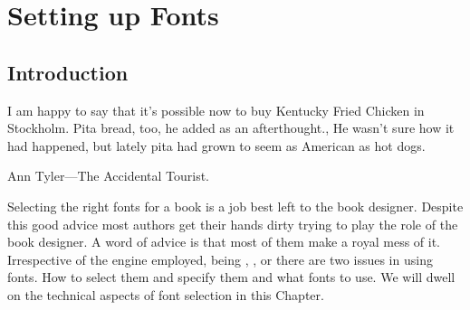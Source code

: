\newfontfamily{}
\let\codetwothousandone\pan
\let\codetwothousand\pan
\newcommand{\mf}{{\fontencoding{U}\fontfamily{zmf}\selectfont METAFONT}}

\newcommand{\pcstrut}{\vrule height11pt width0pt}

\newcommand{\sample}{Typographia Ars Artium Omnium}%

\newcommand{\thefont}[4][OT1]{%
	\textcolor{thefontname}{#2}&%
	\pcstrut\fontencoding{#1}\fontfamily{#3}\selectfont#4\\}

\newcommand{\fonttitle}[1]{%
	\multicolumn2{p{\columnwidth}}{\vrule height1.5pc width0pt
	\fontseries{b}\selectfont\textcolor{black}{#1}}\\[3pt]}


\newfontfamily{}

\newfontfamily{}

\newfontfamily{}

\def\marlborologo{%
{\fboxsep=2pt\marlboro \colorbox{red800}{\textcolor{white}{MARLBORO}}}
}



\chapter{Setting up Fonts}
\label{ch:fonts}
\section{Introduction}

\epigraph{I am happy to say that it's
possible now to buy Kentucky Fried Chicken in Stockholm. Pita bread, too, he added as an
afterthought., He wasn't sure how it had happened, but lately pita had grown to seem as American
as hot dogs.}{Ann Tyler---The Accidental Tourist.}

\pagestyle{headings}
Selecting the right fonts for a book is a job best left to the book designer. Despite this good advice most \latex authors get their hands dirty trying to play the role of the book designer. A word of advice is that most of them make a royal mess of it. Irrespective of the \tex engine employed, being \tex, \latexe, \lualatex or \xelatex there are two issues in using fonts. How to select them and specify them and what fonts to use. We will dwell on the technical aspects of font selection in this Chapter.

